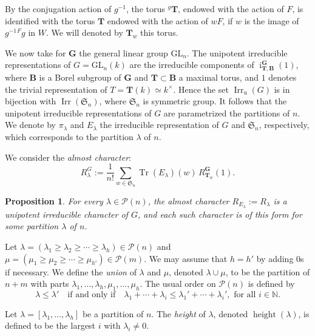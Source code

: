 \documentclass[12pt]{amsart}
\numberwithin{equation}{subsection}
\newtheorem{prop}[equation]{Proposition}
\newcommand{\NN}{\mathbb{N}}
\newcommand{\cP}{\mathcal{P}}
\newcommand{\bB}{\mathbf{B}}
\newcommand{\bG}{\mathbf{G}}
\newcommand{\bT}{\mathbf{T}}
\newcommand{\unip}{\mathrm{u}}
\newcommand{\height}{\operatorname{height}}
\newcommand{\Tr}{\operatorname{Tr}}
\newcommand{\ii}{\operatorname{i}}
\newcommand{\Irr}{\operatorname{Irr}}
\newcommand{\fS}{\mathfrak{S}}
\newcommand{\GL}{\mathrm{GL}}
\begin{document}
By the conjugation action of $g^{-1}$, the torus ${}^g\bT$, endowed with the action of $F$, is identified with the torus $\bT$ endowed with the action of $wF$, if $w$ is the image of $g^{-1}{}^Fg$ in $W$. 
We will denoted by \textit{$\bT_w$} this torus.

\smallskip

We now take for $\bG$  the general linear group $\GL_n$. The unipotent irreducible representations of $G=\GL_n(k)$ are the irreducible components of $\ii_{\bT,\bB}^\bG (1)$, where $\bB$ is a Borel subgroup of 
$\bG$ and $\bT\subset\bB$ a maximal torus, and $1$ denotes the trivial representation of $T=\bT(k)\simeq k^\times$. 
Hence  the  set $\Irr_{\unip}(G)$ is in bijection with $\Irr(\fS_n)$, where $\fS_n$ is symmetric group. It follows that the unipotent irreducible representations of $G$ are parametrized  the partitions of $n$. 
We denote by $\pi_\lambda$ and $E_\lambda$  the irreducible representation of $G$ and $\fS_n$, respectively, which corresponds to the partition $\lambda$ of $n$. 


We consider the \textit{almost character}:
\begin{equation}
 R^G_\lambda:=\frac{1}{n!}\sum_{w\in \fS_n}\Tr(E_\lambda)(w)\,R_{\bT_w}^{\bG}(1).
 \end{equation}


\begin{prop}
For every $\lambda\in\cP(n)$, the almost character $R_{E_\lambda}:=R_\lambda$ is a unipotent irreducible character of $G$, and each such character is of this form for some partition $\lambda$ of $n$.
\end{prop}

Let $\lambda=(\lambda_1\ge\lambda_2\ge\cdots\ge\lambda_h)\in\cP(n)$ and  $\mu=(\mu_1\ge\mu_2\ge\cdots\ge\mu_{h'})\in\cP(m)$. We may assume that $h=h'$ by adding $0$s if necessary.  
We define  the \textit{union} of $\lambda$ and $\mu$, denoted  $\lambda\cup\mu$,  to be the partition of $n+m$ with parts  $\lambda_1,\ldots,\lambda_h,\mu_1,\ldots,\mu_{h}$. 
The usual order on $\cP(n)$ is defined by
\begin{equation}
\lambda\le\lambda'\quad\text{if and only if}\quad \lambda_1+\cdots+\lambda_i\le \lambda_1'+\cdots+\lambda_i',\text{ for all $i\in\NN$.}
\end{equation}

Let $\lambda=[\lambda_1,\ldots,\lambda_h]$ be a partition of $n$. The  \textit{height} of $\lambda$, denoted $\height(\lambda)$,  is defined to be  the largest $i$ with $\lambda_i\ne 0$.
\end{document}
